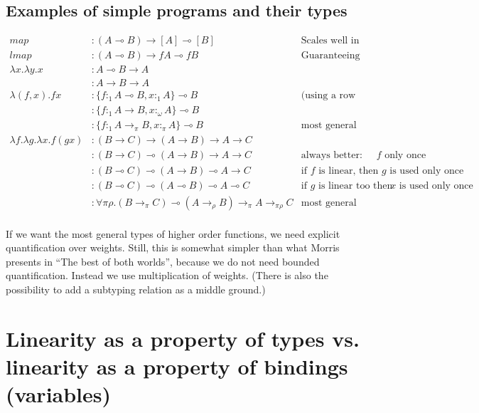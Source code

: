 \documentclass[11pt]{article}
\begin{document}
\subsection{Examples of simple programs and their types}

\hspace{-4cm}\begin{minipage}{\textwidth}
\begin{align*}
map & : (A ⊸ B) → [A] ⊸ [B] & \text{Scales well in unrestricted contexts}\\
lmap & : (A ⊸ B) → f A ⊸ f B & \text{Guaranteeing that no element is lost} \\
λx. λy. x & : A ⊸ B → A \\
          & : A → B → A \\
λ(f,x). f x & : \{f :_1 A ⊸ B, x :_1 A\} ⊸ B & \text{(using a row type for concision)}\\
            & : \{f :_1 A → B, x :_ω A\} ⊸ B \\
            & : \{f :_1 A →_π B, x :_π A\} ⊸ B & \text{most general type} \\ 
λf. λg. λx. f (g x) & : (B → C) → (A → B) → A → C \\
                    & : (B → C) ⊸ (A → B) → A → C & \text {always better: comp uses $f$  only once} \\
                    & : (B ⊸ C) ⊸ (A → B) ⊸ A → C & \text {if $f$ is linear, then $g$ is used only once} \\
                    & : (B ⊸ C) ⊸ (A ⊸ B) ⊸ A ⊸ C & \text {if $g$ is linear too then $x$ is used only once} \\
                    & : ∀ π ρ. (B →_π C) ⊸ (A →_ρ B) →_π A →_{πρ} C & \text{most general type} \\
\end{align*}
\end{minipage}

If we want the most general types of higher order functions, we need
explicit quantification over weights. Still, this is somewhat simpler
than what Morris presents in ``The best of both worlds'', because we
do not need bounded quantification. Instead we use multiplication of
weights. (There is also the possibility to add a subtyping relation as
a middle ground.)

\section{Linearity as a property of types vs. linearity as a property of bindings (variables)}
\end{document}
